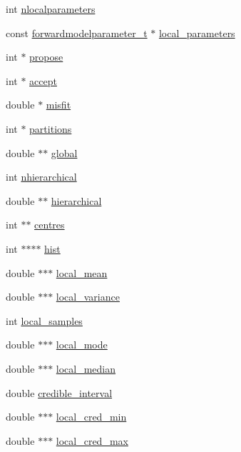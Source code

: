 \begin{DoxyCompactItemize}
\item 
int \hyperlink{struct__resultset2dfm_ae7d70d65213bc9877b3a2cbd08ae9b87}{nlocalparameters}
\item 
const \hyperlink{forwardmodelparameter_8h_a18a7d2fd51fab097145725d83ac328e3}{forwardmodelparameter\+\_\+t} $\ast$ \hyperlink{struct__resultset2dfm_a159adca19c1c6e9f85ea83590113a802}{local\+\_\+parameters}
\item 
int $\ast$ \hyperlink{struct__resultset2dfm_a52e3d26f1dac68365ca7b14da19b1cae}{propose}
\item 
int $\ast$ \hyperlink{struct__resultset2dfm_a5856aafd834dbba8fdea6fe34eecb196}{accept}
\item 
double $\ast$ \hyperlink{struct__resultset2dfm_a63cad204f75525cdd68757c651f9b062}{misfit}
\item 
int $\ast$ \hyperlink{struct__resultset2dfm_a4eb90b0c43ec8bd0086ac39bcd11df29}{partitions}
\item 
double $\ast$$\ast$ \hyperlink{struct__resultset2dfm_ab5f6e5a2735d6ba07d6290a05e784ddc}{global}
\item 
int \hyperlink{struct__resultset2dfm_a2f12e36554699e39baacb231597f5c88}{nhierarchical}
\item 
double $\ast$$\ast$ \hyperlink{struct__resultset2dfm_a46617b8c3c957540fee87fe0bcf0dcd6}{hierarchical}
\item 
int $\ast$$\ast$ \hyperlink{struct__resultset2dfm_af4e9289be60e4d2d09306de249b20a38}{centres}
\item 
int $\ast$$\ast$$\ast$$\ast$ \hyperlink{struct__resultset2dfm_a0a4ebd9da7a78fd2ecd538da79997bf6}{hist}
\item 
double $\ast$$\ast$$\ast$ \hyperlink{struct__resultset2dfm_ad3299fe0e2648f632471f961608af8ad}{local\+\_\+mean}
\item 
double $\ast$$\ast$$\ast$ \hyperlink{struct__resultset2dfm_aebba0491d271c5566885d8c303c54a1c}{local\+\_\+variance}
\item 
int \hyperlink{struct__resultset2dfm_a45f582addfb36964f8ded22f36945e3a}{local\+\_\+samples}
\item 
double $\ast$$\ast$$\ast$ \hyperlink{struct__resultset2dfm_a7ef13535ec30b0d2a6f83a56ba89696d}{local\+\_\+mode}
\item 
double $\ast$$\ast$$\ast$ \hyperlink{struct__resultset2dfm_a2aa671193fbb38759ae2069b096ce3c0}{local\+\_\+median}
\item 
double \hyperlink{struct__resultset2dfm_a25273ec9d03eea17fb0771299daaf0b3}{credible\+\_\+interval}
\item 
double $\ast$$\ast$$\ast$ \hyperlink{struct__resultset2dfm_a6c926d3a6cd5ad78cf9d2250439f063f}{local\+\_\+cred\+\_\+min}
\item 
double $\ast$$\ast$$\ast$ \hyperlink{struct__resultset2dfm_a0967da81d5d8c436260604450a614902}{local\+\_\+cred\+\_\+max}
\end{DoxyCompactItemize}


